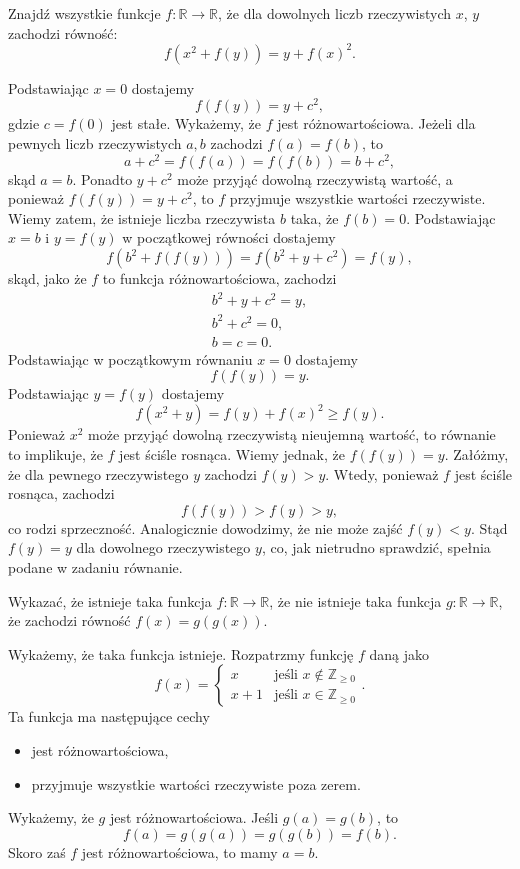 \begin{problem}{5}
	Znajdź wszystkie funkcje $f:\mathbb{R}\longrightarrow\mathbb{R}$, że dla dowolnych liczb rzeczywistych $x$, $y$ zachodzi równość:
	\[
		f(x^2 + f(y)) = y + f(x)^2.
	\]
\end{problem}


\noindent
Podstawiając $x = 0$ dostajemy 
\[
	f(f(y)) = y + c^2,
\] 
gdzie $c = f(0)$ jest stałe. Wykażemy, że $f$ jest różnowartościowa. Jeżeli dla pewnych liczb rzeczywistych $a, b$ zachodzi $f(a) = f(b)$, to 
\[
	a+c^2 = f(f(a)) = f(f(b)) = b+c^2,
\]
skąd $a = b$.
Ponadto $y + c^2$ może przyjąć dowolną rzeczywistą wartość, a ponieważ $f(f(y)) = y + c^2$, to $f$ przyjmuje wszystkie wartości rzeczywiste.
Wiemy zatem, że istnieje liczba rzeczywista $b$ taka, że $f(b) = 0$. Podstawiając $x = b$ i $y = f(y)$ w początkowej równości dostajemy 
\[
	f(b^2 + f(f(y))) = f(b^2 + y + c^2) = f(y),
\]
skąd, jako że $f$ to funkcja różnowartościowa, zachodzi 
\begin{align*}
	b^2 + y + c^2 = y, \\
	b^2 + c^2 = 0, \\
	b = c = 0.
\end{align*}
Podstawiając w początkowym równaniu $x = 0$ dostajemy 
\[
	f(f(y)) = y.
\] 
Podstawiając $y = f(y)$  dostajemy 
\[
	f(x^2 + y) = f(y) + f(x)^2 \geqslant f(y).
\]
Ponieważ $x^2$ może przyjąć dowolną rzeczywistą nieujemną wartość, to równanie to implikuje, że $f$ jest ściśle rosnąca. Wiemy jednak, że $f(f(y)) = y$. Załóżmy, że dla pewnego rzeczywistego $y$ zachodzi $f(y) > y$. Wtedy, ponieważ $f$ jest ściśle rosnąca,
zachodzi 
\[
	f(f(y)) > f(y) > y,
\] 
co rodzi sprzeczność. Analogicznie dowodzimy, że nie może zajść $f(y) < y$. Stąd $f(y) = y$ dla dowolnego rzeczywistego $y$, co, jak nietrudno sprawdzić, spełnia podane w zadaniu równanie.

\vspace{10px}

\begin{problem}{6}
	Wykazać, że istnieje taka funkcja $f:\mathbb{R}\longrightarrow\mathbb{R}$, że nie istnieje taka funkcja $g:\mathbb{R}\longrightarrow\mathbb{R}$, że zachodzi równość $f(x) = g(g(x))$.
\end{problem}

\noindent
Wykażemy, że taka funkcja istnieje. Rozpatrzmy funkcję $f$ daną jako
\[
	f(x) = 	\begin{cases} 
				x &\mbox{jeśli } x \notin \mathbb{Z}_{\geqslant 0} \\ 
				x + 1 & \mbox{jeśli } x \in \mathbb{Z}_{\geqslant 0}
			\end{cases}.
\]
Ta funkcja ma następujące cechy
\begin{itemize}
	\item jest różnowartościowa,
	\item przyjmuje wszystkie wartości rzeczywiste poza zerem.
\end{itemize}
Wykażemy, że $g$ jest różnowartościowa. Jeśli $g(a) = g(b)$, to
\[
	f(a) = g(g(a)) = g(g(b)) = f(b).
\]
Skoro zaś $f$ jest różnowartościowa, to mamy $a = b$.

